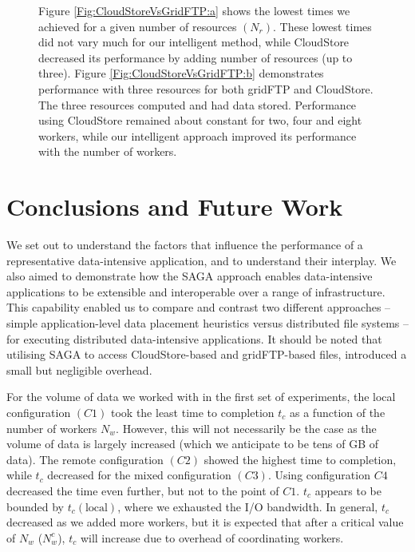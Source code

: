 \documentclass{rspublic}
\begin{document}
\begin{figure}
\begin{center}
{\label{Fig:CloudStoreVsGridFTP:b}
}
\caption{Figure \ref{Fig:CloudStoreVsGridFTP:a}
 shows the lowest times we achieved for a given number of resources
 $(N_{r})$. These lowest times did not vary much for our intelligent
 method, while CloudStore decreased its performance by adding number of
 resources (up to three). Figure \ref{Fig:CloudStoreVsGridFTP:b}
 demonstrates performance with three resources for both gridFTP and
 CloudStore. The three resources computed and had data stored.
 Performance using CloudStore remained about constant for two, four and
 eight workers, while our intelligent approach improved its performance
 with the number of workers.}
\label{Fig:CloudStoreVsGridFTP}
\end{center}
\vspace{-0.3cm}
\end{figure}

%


\section{Conclusions and Future Work}


We set out to understand the factors that influence the performance of
a representative data-intensive application, and to understand their
interplay. We also aimed to demonstrate how the SAGA approach enables
data-intensive applications to be extensible and interoperable over a
range of infrastructure.  This capability enabled us to compare and
contrast two different approaches -- simple application-level data
placement heuristics versus distributed file systems -- for executing
distributed data-intensive applications. It should be noted that 
utilising SAGA to access CloudStore-based and gridFTP-based files,
introduced a small but negligible overhead.

For the volume of data we worked with in the first set of experiments,
the local configuration $(C1)$ took the least time to completion $t_c$
as a function of the number of workers $N_w$. However, this will not
necessarily be the case as the volume of data is largely increased
(which we anticipate to be tens of GB of data).  The remote
configuration $(C2)$ showed the highest time to completion, while
$t_c$ decreased for the mixed configuration $(C3)$. Using
configuration $C4$ decreased the time even further, but not to the
point of $C1$. $t_c$ appears to be bounded by $t_c(\mbox{local})$,
where we exhausted the I/O bandwidth.  In general, $t_c$ decreased as
we added more workers, but it is expected that after a critical value
of $N_w$ ($N^c_w$), $t_c$ will increase due to overhead of
coordinating workers.
\end{document}
